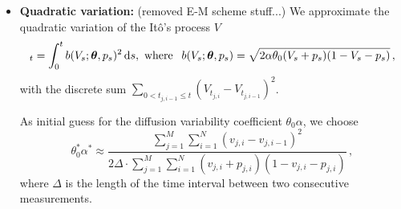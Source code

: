 \documentclass[11pt]{article}
\theoremstyle{definition}
\begin{document}
\begin{itemize}
\item \textbf{Quadratic variation:} {\color{red}(removed E-M scheme stuff...)} We approximate the quadratic variation of the  It\^{o}'s  process $V$
\begin{equation*}
[V]_t=\int_0^t b(V_s; \bm{\theta}, p_s)^2 \dif s, \text{ where }  \:\: b(V_s; \bm{\theta}, p_s) = 
\sqrt{2 \alpha \theta_0 (V_s +p_s ) (1-V_s - p_s)}\,,
\end{equation*}
with the discrete sum $\sum_{0< t_{j, i-1} \leq t}\left(V_{t_{j, i}} - V_{t_{j, i-1}}\right)^2$.

As initial guess for the diffusion variability coefficient $\theta_0 \alpha$, we choose
\begin{equation}
\theta_0^*\alpha^*\approx\frac{\sum_{j=1}^M\sum_{i=1}^N(v_{j,i} - v_{j,i-1})^2}{2\Delta\cdot\sum_{j=1}^M\sum_{i=1}^N(v_{j,i}+p_{j,i})(1-v_{j,i}-p_{j,i})}\,,
\label{Eq-2}
\end{equation}
where $\Delta$ is the length of the time interval between two consecutive measurements.
\end{itemize}

%
\end{document}

